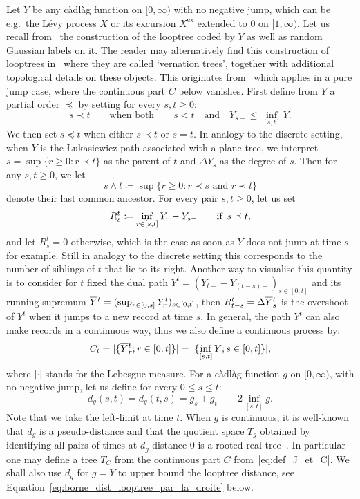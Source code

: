 \documentclass[british, a4paper,11pt]{article}
\numberwithin{equation}{section}
\theoremstyle{definition}
\newcommand{\exc}{\mathrm{ex}}
\begin{document}
Let $Y$ be any c\`adl\`ag function on $[0, \infty)$ with no negative jump, which can be e.g.~the L\'evy process $X$ or its excursion $X^{\exc}$ extended to $0$ on $[1, \infty)$.
Let us recall from~\cite{Mar24} the construction of the looptree coded by $Y$ as well as random Gaussian labels on it. 
The reader may alternatively find this construction of looptrees in~\cite{Kha22} where they are called `vernation trees', together with additional topological details on these objects.
This originates from~\cite{LGM11,CK14} which applies in a pure jump case, where the continuous part $C$ below vanishes. 
First define from $Y$ a partial order $\preceq$ by setting for every $s, t \geq 0$:
\[s \prec t \qquad\text{when both}\qquad s < t \quad\text{and}\quad Y_{s-} \leq \inf_{[s,t]} Y.\]
We then set $s \preceq t$ when either $s \prec t$ or $s=t$. 
In analogy to the discrete setting, when $Y$ is the {\L}ukasiewicz path associated with a plane tree, we interpret $s = \sup\{r \geq 0 \colon r \prec t\}$ as the parent of $t$ and $\Delta Y_s$ as the degree of $s$.
Then for any $s, t \geq 0$, we let
\[s \wedge t \coloneqq \sup\{r \geq 0 \colon r \prec s \text{ and } r \prec t\}\]
denote their last common ancestor.
For every pair $s, t \geq 0$, let us set
\begin{equation}\label{eq:def_R}
R^t_s \coloneqq \inf_{r \in [s,t]} Y_r - Y_{s-} \qquad\text{if}\enskip s \preceq t,
\end{equation}
and let $R^t_s = 0$ otherwise, which is the case as soon as $Y$ does not jump at time $s$ for example.
Still in analogy to the discrete setting this corresponds to the number of siblings of $t$ that lie to its right.
Another way to visualise this quantity is to consider for $t$ fixed the dual path $Y^t = (Y_{t-} - Y_{(t-s)-})_{s \in [0,t]}$ and its running supremum $\overline{Y}\vphantom{Y}^t = (\sup_{r \in [0,s]} Y^t_r)_{s \in [0,t]}$, then $R^t_{t-s} = \Delta \overline{Y}\vphantom{Y}^t_s$ is the overshoot of $Y^t$ when it jumps to a new record at time $s$.
In general, the path $Y^t$ can also make records in a continuous way, thus we also define a continuous process by:
\begin{equation}\label{eq:def_J_et_C}
C_t = |\{\overline{Y}\vphantom{Y}^t_r; r \in [0,t]\}| = |\{\inf_{[s,t]} Y; s \in [0,t]\}|,
\end{equation}
where $|\cdot|$ stands for the Lebesgue measure.
For a c\`adl\`ag function $g$ on $[0,\infty)$, with no negative jump, let us define for every $0 \leq s \leq t$:
\begin{equation}\label{eq:def_distance_arbre}
d_g(s,t) = d_g(t,s) = g_s + g_{t-} - 2 \inf_{[s,t]} g
.\end{equation}
Note that we take the left-limit at time $t$.
When $g$ is continuous, it is well-known that $d_g$ is a pseudo-distance
and that 
the quotient space $T_g$ obtained by identifying all pairs of times at $d_g$-distance $0$ is a rooted real tree~\cite{LG05}.
In particular one may define a tree $T_C$ from the continuous part $C$ from~\eqref{eq:def_J_et_C}.
We shall also use $d_g$ for $g=Y$ to upper bound the looptree distance, see Equation~\eqref{eq:borne_dist_looptree_par_la_droite} below.
\end{document}

